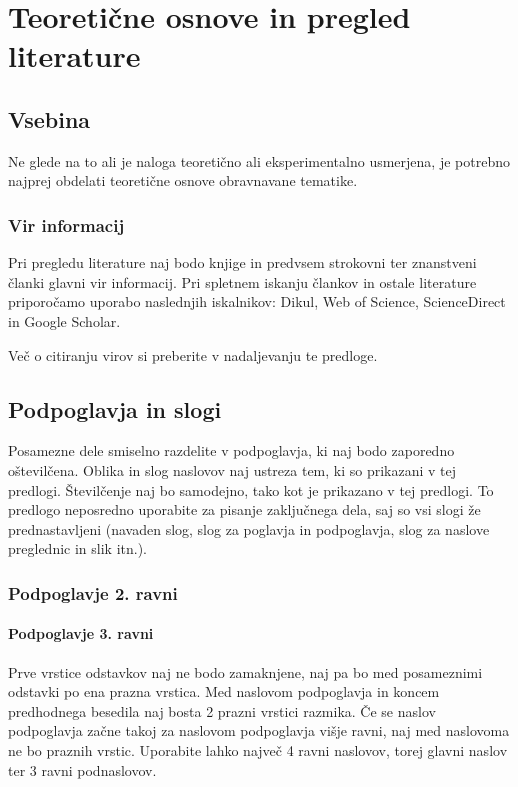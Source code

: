 \chapter{Teoretične osnove in pregled literature}\label{cha:teoreticne_osnove}

\section{Vsebina}\label{sec:vsebina}
Ne glede na to ali je naloga teoretično ali eksperimentalno usmerjena, je potrebno najprej obdelati teoretične osnove obravnavane tematike.

\subsection{Vir informacij}\label{sec:vir_informacij}
Pri pregledu literature naj bodo knjige in predvsem strokovni ter znanstveni članki glavni vir informacij. Pri spletnem iskanju člankov in ostale literature priporočamo uporabo naslednjih iskalnikov: Dikul, Web of Science, ScienceDirect in Google Scholar.

Več o citiranju virov si preberite v nadaljevanju te predloge.

\section{Podpoglavja in slogi}\label{sec:podpoglavja}
Posamezne dele smiselno razdelite v podpoglavja, ki naj bodo zaporedno oštevilčena. Oblika in slog naslovov naj ustreza tem, ki so prikazani v tej predlogi. Številčenje naj bo samodejno, tako kot je prikazano v tej predlogi. To predlogo neposredno uporabite za pisanje zaključnega dela, saj so vsi slogi že prednastavljeni (navaden slog, slog za poglavja in podpoglavja, slog za naslove preglednic in slik itn.).

\subsection{Podpoglavje 2. ravni}\label{sec:poglavje_2}
\subsubsection{Podpoglavje 3. ravni}\label{sec:poglavje_3}

Prve vrstice odstavkov naj ne bodo zamaknjene, naj pa bo med posameznimi odstavki po ena prazna vrstica. Med naslovom podpoglavja in koncem predhodnega besedila naj bosta 2 prazni vrstici razmika. Če se naslov podpoglavja začne takoj za naslovom podpoglavja višje ravni, naj med naslovoma ne bo praznih vrstic. Uporabite lahko največ 4 ravni naslovov, torej glavni naslov ter 3 ravni podnaslovov.

